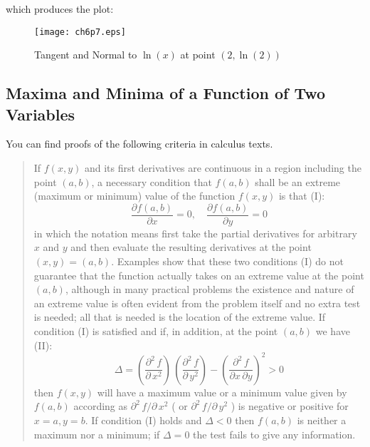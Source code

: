 \documentclass[12pt]{article}
\begin{document}
\newpage
which produces the plot:
\begin{figure} [h]
   \centerline{\texttt{[image: ch6p7.eps]} }
	\caption{ Tangent and Normal to $\ln(x)$ at point $(2,\ln(2))$  }
\end{figure}      

\smallskip
\subsection{Maxima and Minima of a Function of Two Variables}
You can find proofs of the following criteria in calculus texts.

\small
\begin{quote}
If $f(x,y)$ and its first derivatives are continuous in a region including
 the point $(a,b)$, a necessary condition that $f(a,b)$ shall be an extreme (maximum
 or minimum) value of the function $f(x,y)$ is that (I):
\begin{equation}
 \frac{\partial f(a,b)}{\partial x} = 0, \quad  \frac{\partial f(a,b)}{\partial y} = 0
\end{equation}
in which the notation means first take the partial derivatives for arbitrary $x$ and $y$
  and then evaluate the resulting derivatives at the point $(x,y) = (a,b)$.
\smallskip
Examples show that these two conditions (I) do not guarantee that the function actually
  takes on an extreme value at the point $(a,b)$, although in many practical problems
  the existence and nature of an extreme value is often evident from the problem
  itself and no extra test is needed; all that is needed is the location of the
  extreme value.
\smallskip
If condition (I) is satisfied and if, in addition, at the point $(a,b)$ we have (II):
\begin{equation}
 \Delta = \left(\frac{\partial^2\,f}{\partial \, x^2} \right)\, \left(\frac{\partial^2\,f}{\partial \, y^2} \right) -
            \left(\frac{\partial^2\,f}{\partial x \,\partial y} \right)^2  > 0
\end{equation}  
then $f(x,y)$ will have a maximum value or a minimum value given by $f(a,b)$ according as 
  $\partial^2\,f/\partial\,x^2$ ( or $\partial^2\,f/\partial\,y^2$ ) is negative or positive
  for $x=a, y=b$.
\newpage
If condition (I) holds and $\Delta < 0$ then $f(a,b)$ is neither a maximum nor a minimum;
if $\Delta = 0$ the test fails to give any information.  
\end{quote}
\normalsize
\end{document}
